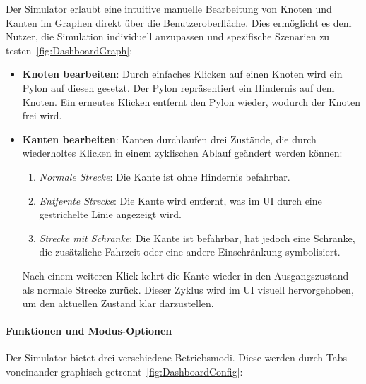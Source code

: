 \documentclass[main.tex]{subfiles} %
\begin{document}
Der Simulator erlaubt eine intuitive manuelle Bearbeitung von Knoten
und Kanten im Graphen direkt über die Benutzeroberfläche. Dies
ermöglicht es dem Nutzer, die Simulation individuell anzupassen und
spezifische Szenarien zu testen~\ref{fig:DashboardGraph}:

\begin{itemize}
  \item \textbf{Knoten bearbeiten}:
    Durch einfaches Klicken auf einen Knoten wird ein Pylon auf
    diesen gesetzt. Der Pylon repräsentiert ein Hindernis auf dem
    Knoten. Ein erneutes Klicken entfernt den Pylon wieder, wodurch
    der Knoten frei wird.

  \item \textbf{Kanten bearbeiten}:
    Kanten durchlaufen drei Zustände, die durch wiederholtes Klicken
    in einem zyklischen Ablauf geändert werden können:
    \begin{enumerate}
      \item \textit{Normale Strecke}: Die Kante ist ohne Hindernis befahrbar.
      \item \textit{Entfernte Strecke}: Die Kante wird entfernt, was
        im UI durch eine gestrichelte Linie angezeigt wird.
      \item \textit{Strecke mit Schranke}: Die Kante ist befahrbar,
        hat jedoch eine Schranke, die zusätzliche Fahrzeit oder eine
        andere Einschränkung symbolisiert.
    \end{enumerate}
    Nach einem weiteren Klick kehrt die Kante wieder in den
    Ausgangszustand als normale Strecke zurück. Dieser Zyklus wird im
    UI visuell hervorgehoben, um den aktuellen Zustand klar darzustellen.
\end{itemize}

\paragraph{Funktionen und Modus-Optionen}

Der Simulator bietet drei verschiedene Betriebsmodi. Diese werden
durch Tabs voneinander graphisch getrennt~\ref{fig:DashboardConfig}:
\end{document}
